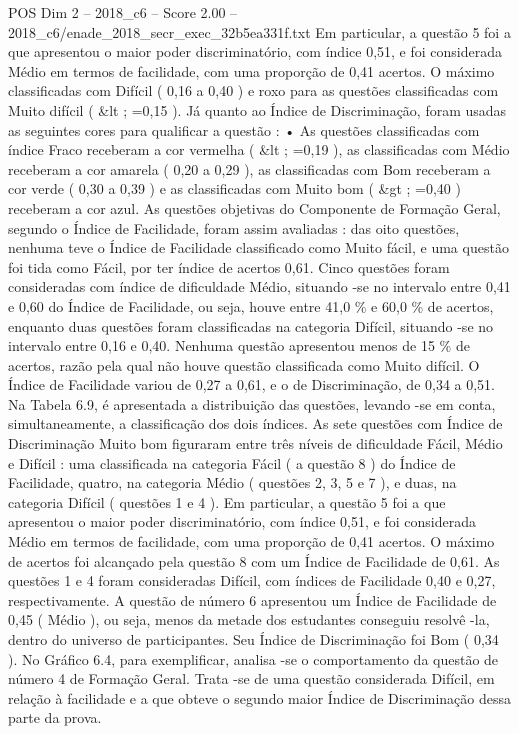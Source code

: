 \begin{textsample}{POS Dim 2 – 2018\_c6 – Score 2.00 – 2018\_c6/enade\_2018\_secr\_exec\_32b5ea331f.txt}
Em particular, a questão 5 foi a que apresentou o maior poder discriminatório, com índice 0,51, e foi considerada Médio em termos de facilidade, com uma proporção de 0,41 acertos.
O máximo classificadas com Difícil ( 0,16 a 0,40 ) e roxo para as questões classificadas com Muito difícil ( \&lt ; =0,15 ).
Já quanto ao Índice de Discriminação, foram usadas as seguintes cores para qualificar a questão : • As questões classificadas com índice Fraco receberam a cor vermelha ( \&lt ; =0,19 ), as classificadas com Médio receberam a cor amarela ( 0,20 a 0,29 ), as classificadas com Bom receberam a cor verde ( 0,30 a 0,39 ) e as classificadas com Muito bom ( \&gt ; =0,40 ) receberam a cor azul.
As questões objetivas do Componente de Formação Geral, segundo o Índice de Facilidade, foram assim avaliadas : das oito questões, nenhuma teve o Índice de Facilidade classificado como Muito fácil, e uma questão foi tida como Fácil, por ter índice de acertos 0,61.
Cinco questões foram consideradas com índice de dificuldade Médio, situando -se no intervalo entre 0,41 e 0,60 do Índice de Facilidade, ou seja, houve entre 41,0 \% e 60,0 \% de acertos, enquanto duas questões foram classificadas na categoria Difícil, situando -se no intervalo entre 0,16 e 0,40.
Nenhuma questão apresentou menos de 15 \% de acertos, razão pela qual não houve questão classificada como Muito difícil.
O Índice de Facilidade variou de 0,27 a 0,61, e o de Discriminação, de 0,34 a 0,51.
Na Tabela 6.9, é apresentada a distribuição das questões, levando -se em conta, simultaneamente, a classificação dos dois índices.
As sete questões com Índice de Discriminação Muito bom figuraram entre três níveis de dificuldade Fácil, Médio e Difícil : uma classificada na categoria Fácil ( a questão 8 ) do Índice de Facilidade, quatro, na categoria Médio ( questões 2, 3, 5 e 7 ), e duas, na categoria Difícil ( questões 1 e 4 ).
Em particular, a questão 5 foi a que apresentou o maior poder discriminatório, com índice 0,51, e foi considerada Médio em termos de facilidade, com uma proporção de 0,41 acertos.
O máximo de acertos foi alcançado pela questão 8 com um Índice de Facilidade de 0,61.
As questões 1 e 4 foram consideradas Difícil, com índices de Facilidade 0,40 e 0,27, respectivamente.
A questão de número 6 apresentou um Índice de Facilidade de 0,45 ( Médio ), ou seja, menos da metade dos estudantes conseguiu resolvê -la, dentro do universo de participantes.
Seu Índice de Discriminação foi Bom ( 0,34 ).
No Gráfico 6.4, para exemplificar, analisa -se o comportamento da questão de número 4 de Formação Geral.
Trata -se de uma questão considerada Difícil, em relação à facilidade e a que obteve o segundo maior Índice de Discriminação dessa parte da prova.

\end{textsample}
